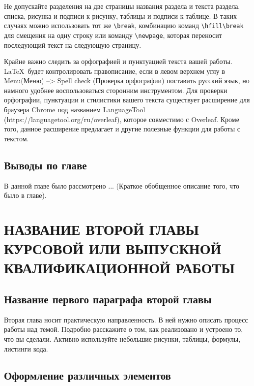 \documentclass{report}
\begin{document}

Не допускайте разделения на две страницы названия раздела и текста раздела, списка, рисунка и подписи к рисунку, таблицы и подписи к таблице. В таких случаях можно использовать тот же \verb|\break|, комбинацию команд \verb|\hfill\break| для смещения на одну строку или команду \verb|\newpage|, которая переносит последующий текст на следующую страницу.


Крайне важно следить за орфографией и пунктуацией текста вашей работы. \LaTeX\ будет контролировать правописание, если в левом верхнем углу в Menu(Меню) --> Spell check (Проверка орфографии) поставить русский язык, но намного удобнее воспользоваться сторонним инструментом. Для проверки орфографии, пунктуации и стилистики вашего текста существует расширение для браузера Chrome под названием LanguageTool (https://languagetool.org/ru/overleaf), которое совместимо с Overleaf. Кроме того, данное расширение предлагает и другие полезные функции для работы с текстом.

\section*{Выводы по главе}
В данной главе было рассмотрено ... (Краткое обобщенное описание того, что было в главе).


\chapter{НАЗВАНИЕ ВТОРОЙ ГЛАВЫ КУРСОВОЙ ИЛИ ВЫПУСКНОЙ КВАЛИФИКАЦИОННОЙ РАБОТЫ}
\setcounter{section}{0}
\setcounter{subsection}{0}
\setcounter{equation}{0}
\section{Название первого параграфа второй главы}

Вторая глава носит практическую направленность. В ней нужно описать процесс работы над темой. Подробно расскажите о том, как реализовано и устроено то, что вы сделали. Активно используйте небольшие рисунки, таблицы, формулы, листинги кода. 

\section{Оформление различных элементов}
\end{document}
